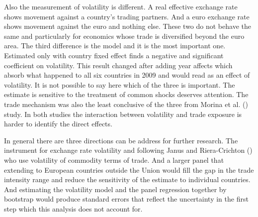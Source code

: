 \vspace{\baselineskip}

Also the measurement of volatility is different.
A real effective exchange rate shows movement against a country's trading partners.
And a euro exchange rate shows movement against the euro and nothing else.
These two do not behave the same and particularly for economics whose trade is diversified beyond the euro area.
The third difference is the model and it is the most important one.
Estimated only with country fixed effect finds a negative and significant coefficient on volatility.
This result changed after adding year affects which absorb what happened to all six countries in 2009 and would read as an effect of volatility.
It is not possible to say here which of the three is important.
The estimate is sensitive to the treatment of common shocks deserves attention.
The trade mechanism was also the least conclusive of the three from Morina et al. (\citeyear{morina_effect_2020}) study.
In both studies the interaction between volatility and trade exposure is harder to identify the direct effects.

\vspace{\baselineskip}

In general there are three directions can be address for further research.
The instrument for exchange rate volatility and following Janus and Riera-Crichton (\citeyear{thorsten_pdf_2015}) who use volatility of commodity terms of trade.
And a larger panel that extending to European countries outside the Union would fill the gap in the trade intensity range and reduce the sensitivity of the estimate to individual countries.
And estimating the volatility model and the panel regression together by bootstrap would produce standard errors that reflect the uncertainty in the first step which this analysis does not account for.

